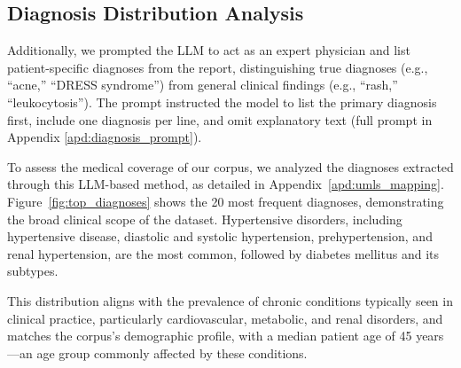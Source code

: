 


\subsection{Diagnosis Distribution Analysis}

Additionally, we prompted the LLM to act as an expert physician and list patient-specific diagnoses from the report, distinguishing true diagnoses (e.g., “acne,” “DRESS syndrome”) from general clinical findings (e.g., “rash,” “leukocytosis”). The prompt instructed the model to list the primary diagnosis first, include one diagnosis per line, and omit explanatory text (full prompt in Appendix \ref{apd:diagnosis_prompt}).

To assess the medical coverage of our corpus, we analyzed the diagnoses extracted through this LLM-based method, as detailed in Appendix~\ref{apd:umls_mapping}. Figure~\ref{fig:top_diagnoses} shows the 20 most frequent diagnoses, demonstrating the broad clinical scope of the dataset. Hypertensive disorders, including hypertensive disease, diastolic and systolic hypertension, prehypertension, and renal hypertension, are the most common, followed by diabetes mellitus and its subtypes.

This distribution aligns with the prevalence of chronic conditions typically seen in clinical practice, particularly cardiovascular, metabolic, and renal disorders, and matches the corpus’s demographic profile, with a median patient age of 45 years—an age group commonly affected by these conditions.

